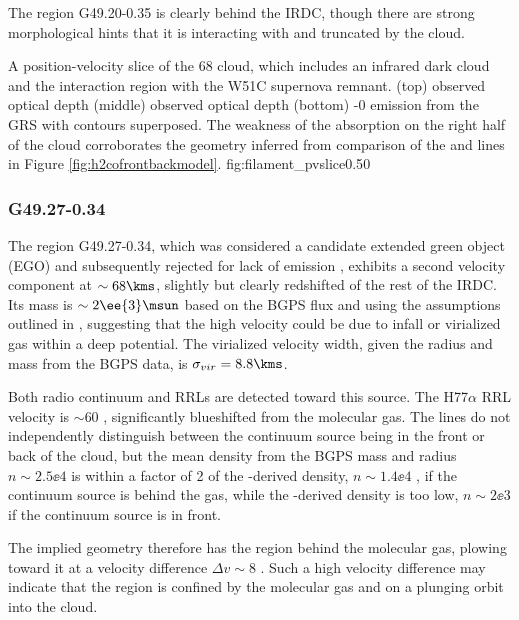 The \hii region G49.20-0.35 is clearly behind the IRDC, though there are strong
morphological hints that it is interacting with and truncated by the cloud.

{A position-velocity slice of the 68 \kms cloud, which includes an infrared dark
cloud and the interaction region with the W51C supernova remnant.
(top) \formaldehyde \oneone observed optical depth
(middle) \formaldehyde \twotwo observed optical depth
(bottom) -0 emission from the GRS with \formaldehyde \oneone
contours superposed.  The weakness of the \formaldehyde absorption on the right
half of the cloud corroborates the geometry inferred from comparison of the \oneone
and \twotwo lines in Figure \ref{fig:h2cofrontbackmodel}.}
{fig:filament_pvslice}{0.5}{0}

\subsubsection{G49.27-0.34}
The \uchii region G49.27-0.34, which was considered a candidate extended green
object (EGO) and subsequently rejected for lack of \hh emission
\citep{deBuizer2010a,Lee2013a}, exhibits a second velocity component at $\sim68
\kms$, slightly but clearly redshifted of the rest of the IRDC.  Its mass is
$\sim2\ee{3} \msun$ based on the BGPS flux and using the assumptions outlined
in \citet{Aguirre2011a}, suggesting that the high velocity could be due to
infall or virialized gas within a deep potential.  The virialized velocity
width, given the radius and mass from the BGPS data, is $\sigma_{vir}=8.8 \kms$.

Both radio continuum and RRLs are detected toward this source.  The H77$\alpha$
RRL velocity is $\sim60$ \kms, significantly blueshifted from the molecular
gas.  The \formaldehyde lines do not independently distinguish between the
continuum source being in the front or back of the cloud, but the mean density
from the BGPS mass and radius $n\sim2.5\ee{4}$ \percc is within a factor of 2
of the \formaldehyde-derived density, $n\sim1.4\ee{4}$ \percc, if the continuum
source is behind the gas, while the \formaldehyde-derived density is too low,
$n\sim2\ee{3}$ \percc if the continuum source is in front.

The implied geometry therefore has the \hii region behind the molecular gas,
plowing toward it at a velocity difference $\Delta v \sim 8$ \kms.
Such a high velocity difference may indicate that the \hii region is confined by
the molecular gas and on a plunging orbit into the cloud.

